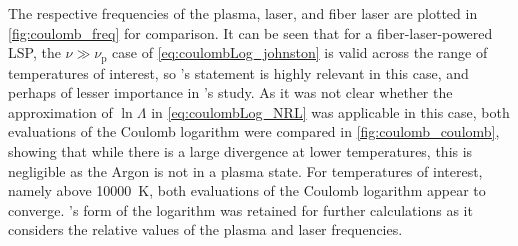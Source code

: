         The respective frequencies of the plasma,  laser, and fiber laser are plotted in \autoref{fig:coulomb_freq} for comparison. It can be seen that for a fiber-laser-powered LSP, the $\nu \gg \nu_\mathrm{p}$ case of \autoref{eq:coulombLog_johnston} is valid across the range of temperatures of interest, so \citeauthor{johnstonCorrectValuesHighfrequency1973}'s statement is highly relevant in this case, and perhaps of lesser importance in \citeauthor{nassarInvestigationLasersustainedPlasma2012}'s study. As it was not clear whether the approximation of $\ln{\Lambda}$ in \autoref{eq:coulombLog_NRL} was applicable in this case, both evaluations of the Coulomb logarithm were compared in \autoref{fig:coulomb_coulomb}, showing that while there is a large divergence at lower temperatures, this is negligible as the Argon is not in a plasma state. For temperatures of interest, namely above \qty{10000}{K}, both evaluations of the Coulomb logarithm appear to converge. \citeauthor{johnstonCorrectValuesHighfrequency1973}'s form of the logarithm was retained for further calculations as it considers the relative values of the plasma and laser frequencies.

